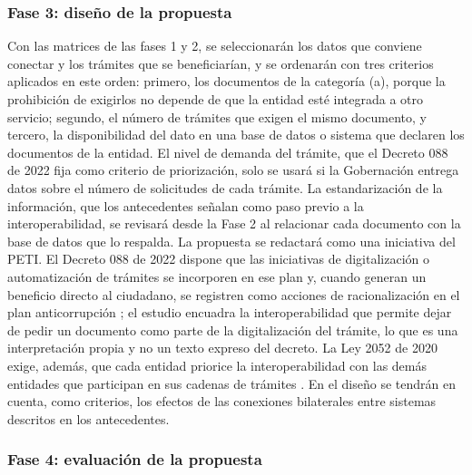 \subsubsection{Fase 3: diseño de la propuesta}

Con las matrices de las fases 1 y 2, se seleccionarán los datos que conviene conectar y los trámites que se beneficiarían, y se ordenarán con tres criterios aplicados en este orden: primero, los documentos de la categoría (a), porque la prohibición de exigirlos no depende de que la entidad esté integrada a otro servicio; segundo, el número de trámites que exigen el mismo documento, y tercero, la disponibilidad del dato en una base de datos o sistema que declaren los documentos de la entidad. El nivel de demanda del trámite, que el Decreto 088 de 2022 fija como criterio de priorización, solo se usará si la Gobernación entrega datos sobre el número de solicitudes de cada trámite. La estandarización de la información, que los antecedentes señalan como paso previo a la interoperabilidad, se revisará desde la Fase 2 al relacionar cada documento con la base de datos que lo respalda. La propuesta se redactará como una iniciativa del PETI. El Decreto 088 de 2022 dispone que las iniciativas de digitalización o automatización de trámites se incorporen en ese plan y, cuando generan un beneficio directo al ciudadano, se registren como acciones de racionalización en el plan anticorrupción \parencite[Anexo 1, num. 2.3.2]{colombia2022decreto088}; el estudio encuadra la interoperabilidad que permite dejar de pedir un documento como parte de la digitalización del trámite, lo que es una interpretación propia y no un texto expreso del decreto. La Ley 2052 de 2020 exige, además, que cada entidad priorice la interoperabilidad con las demás entidades que participan en sus cadenas de trámites \parencite[art. 8]{colombia2020ley2052}. En el diseño se tendrán en cuenta, como criterios, los efectos de las conexiones bilaterales entre sistemas descritos en los antecedentes.

\subsubsection{Fase 4: evaluación de la propuesta}

